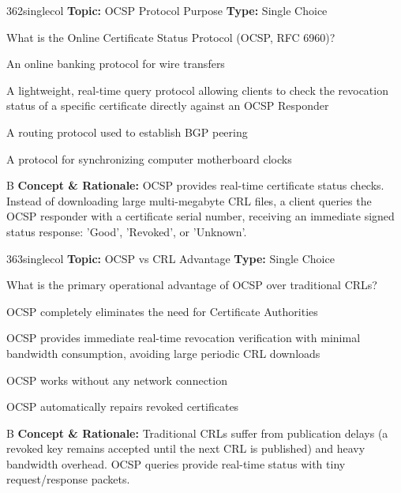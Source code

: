 \begin{qcard}{362}{singlecol}
\textcolor{darkslate!75}{\small\textbf{Topic:} OCSP Protocol Purpose \hfill \textbf{Type:} Single Choice}\vspace{0.4em}\par
What is the Online Certificate Status Protocol (OCSP, RFC 6960)?
\begin{qoptions}
\item An online banking protocol for wire transfers
\item A lightweight, real-time query protocol allowing clients to check the revocation status of a specific certificate directly against an OCSP Responder
\item A routing protocol used to establish BGP peering
\item A protocol for synchronizing computer motherboard clocks
\end{qoptions}
\end{qcard}
\nopagebreak
\begin{explainbox}{B}
\textbf{Concept \& Rationale:} OCSP provides real-time certificate status checks. Instead of downloading large multi-megabyte CRL files, a client queries the OCSP responder with a certificate serial number, receiving an immediate signed status response: 'Good', 'Revoked', or 'Unknown'.
\end{explainbox}

\begin{qcard}{363}{singlecol}
\textcolor{darkslate!75}{\small\textbf{Topic:} OCSP vs CRL Advantage \hfill \textbf{Type:} Single Choice}\vspace{0.4em}\par
What is the primary operational advantage of OCSP over traditional CRLs?
\begin{qoptions}
\item OCSP completely eliminates the need for Certificate Authorities
\item OCSP provides immediate real-time revocation verification with minimal bandwidth consumption, avoiding large periodic CRL downloads
\item OCSP works without any network connection
\item OCSP automatically repairs revoked certificates
\end{qoptions}
\end{qcard}
\nopagebreak
\begin{explainbox}{B}
\textbf{Concept \& Rationale:} Traditional CRLs suffer from publication delays (a revoked key remains accepted until the next CRL is published) and heavy bandwidth overhead. OCSP queries provide real-time status with tiny request/response packets.
\end{explainbox}

